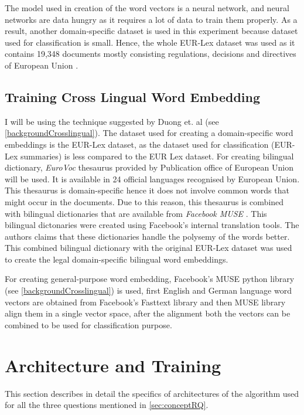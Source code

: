 The model used in creation of the word vectors is a neural network, and neural networks are data hungry as it requires a lot of data to train them properly. As a result, another domain-specific dataset is used in this experiment because dataset used for classification is small. Hence, the whole EUR-Lex dataset was used as it contains 19,348 documents mostly consisting regulations, decisions and directives of European Union \cite{jf:SemanticLaw}.

\subsection{Training Cross Lingual Word Embedding}\label{implementationCrossLingual}

I will be using the technique suggested by Duong et. al \cite{duong-EtAl:2016:EMNLP} (see \ref{backgroundCrosslingual}).
The dataset used for creating a domain-specific word embeddings is the EUR-Lex dataset, as the dataset used for classification (EUR-Lex summaries) is less compared to the EUR Lex dataset. For creating bilingual dictionary, \textit{EuroVoc} thesaurus \cite{steinberger2002cross} provided by Publication office of European Union will be used. It is available in 24 official languages recognised by European Union. This thesaurus is domain-specific hence it does not involve common words that might occur in the documents. Due to this reason, this thesaurus is combined with bilingual dictionaries that are available from \textit{Facebook MUSE} \cite{conneau2017word}. This bilingual dictonaries were created using Facebook's internal translation tools. The authors claims that these dictionaries handle the polysemy of the words better. This combined bilingual dictionary with the original EUR-Lex dataset was used to create the legal domain-specific bilingual word embeddings. 

For creating general-purpose word embedding, Facebook's MUSE python library \cite{conneau2017word} (see \ref{backgroundCrosslingual}) is used, first English and German language word vectors are obtained from Facebook's Fasttext library and then MUSE library align them in a single vector space, after the alignment both the vectors can be combined to be used for classification purpose. 


\section{Architecture and Training}
This section describes in detail the specifics of architectures of the algorithm used for all the three questions mentioned in \ref{sec:conceptRQ}.

